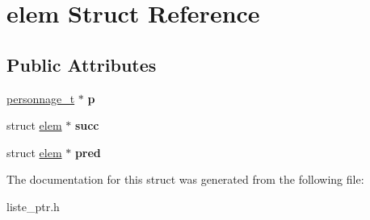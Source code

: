 \hypertarget{structelem}{}\section{elem Struct Reference}
\label{structelem}
\subsection*{Public Attributes}
\begin{DoxyCompactItemize}
\item 
\mbox{\label{structelem_a2b5fc098e5c542b339e12394a4b2c617}} 
\mbox{\hyperlink{structpersonnage__s}{personnage\+\_\+t}} $\ast$ {\bfseries p}
\item 
\mbox{\label{structelem_a5ff1b9cc747d100bbe420f0e0cd88ec2}} 
struct \mbox{\hyperlink{structelem}{elem}} $\ast$ {\bfseries succ}
\item 
\mbox{\label{structelem_abb040e9d86e108c9bede84a513513bb6}} 
struct \mbox{\hyperlink{structelem}{elem}} $\ast$ {\bfseries pred}
\end{DoxyCompactItemize}


The documentation for this struct was generated from the following file\+:\begin{DoxyCompactItemize}
\item 
liste\+\_\+ptr.\+h\end{DoxyCompactItemize}
